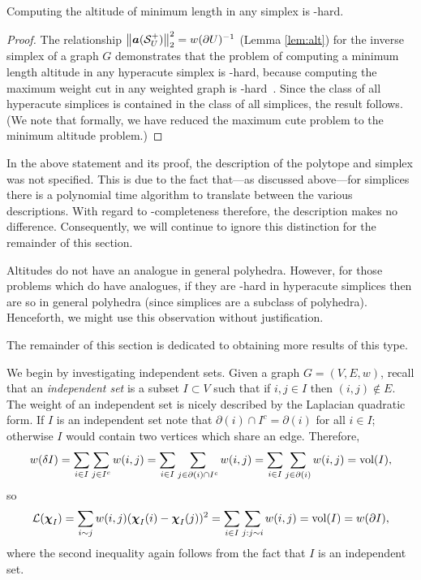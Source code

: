 \begin{lemma}
	\label{lem:altitude_hard}
	Computing the altitude of minimum length in any simplex is \NP-hard. 
\end{lemma}
\begin{proof}
	The relationship $\norm{\vb*{a}(\mathcal{S}^+_U)}_2^2 = w(\partial U)^{-1}$ (Lemma \ref{lem:alt}) for the inverse simplex of a graph $G$ demonstrates that the problem of computing a minimum length altitude in any hyperacute simplex is \NP-hard, because computing the  maximum weight cut in any weighted graph is \NP-hard~\cite{karp1972reducibility}.  Since the  class  of all hyperacute simplices is contained in the class of all simplices, the result follows.  (We note that formally, we have reduced the maximum  cute problem to the minimum altitude problem.) 
\end{proof}

\begin{remark} In  the above statement and its proof, the description of the polytope and simplex was not specified. This is due to the fact that---as discussed above---for simplices there is a polynomial time algorithm to translate between the various descriptions. With regard to \NP-completeness therefore, the description makes no difference. Consequently, we will continue to ignore this distinction for the remainder of this section. 
\end{remark}


\begin{remark}
Altitudes do  not have  an analogue in general polyhedra. However, for  those problems which do have analogues, 
if they are \NP-hard in hyperacute simplices then are so in general polyhedra (since simplices are a subclass of polyhedra). Henceforth, we might use this observation  without justification. 
\end{remark}


The remainder of this section is dedicated to obtaining more results of this type. 

We begin by investigating independent sets. Given a graph $G=(V,E,w)$, recall that an \emph{independent set} is a subset $I\subset V$ such that if $i,j\in I$ then $(i,j)\notin E$. 
The weight of an independent set is nicely described by the Laplacian quadratic form. If $I$ is an independent set note that $\partial(i)\cap I^c=\partial(i)$ for all $i\in  I$; otherwise $I$ would contain two vertices  which share an edge.
Therefore, 
\begin{align*}
w(\delta I) = \sum_{i\in  I}\sum_{j\in I^c} w(i,j) = \sum_{i\in I}\sum_{j\in \partial(i)\cap I^c} w(i,j) = \sum_{i\in  I}\sum_{j\in  \partial(i)}w(i,j) = \textnormal{vol}(I),
\end{align*}
so
\begin{align*}
    \mathcal{L}(\boldsymbol{\chi}_I) = \sum_{i\sim j}w(i,j)(\boldsymbol{\chi}_I(i)-\boldsymbol{\chi}_I(j))^2 = \sum_{i\in I}\sum_{j:j\sim i} w(i,j) = \textnormal{vol}(I)=w(\partial I),
\end{align*}
where the second inequality again follows from the fact that $I$ is an independent set. 

